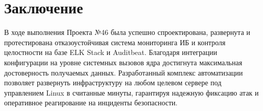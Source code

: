 \documentclass[a4paper,12pt]{article}
\begin{document}
\section{Заключение}
В ходе выполнения Проекта №46 была успешно спроектирована, развернута и протестирована отказоустойчивая система мониторинга ИБ и контроля целостности на базе ELK Stack и Auditbeat. Благодаря интеграции конфигурации на уровне системных вызовов ядра достигнута максимальная достоверность получаемых данных. Разработанный комплекс автоматизации позволяет развернуть инфраструктуру на любом целевом сервере под управлением Linux в считанные минуты, гарантируя надежную фиксацию атак и оперативное реагирование на инциденты безопасности.
\end{document}

